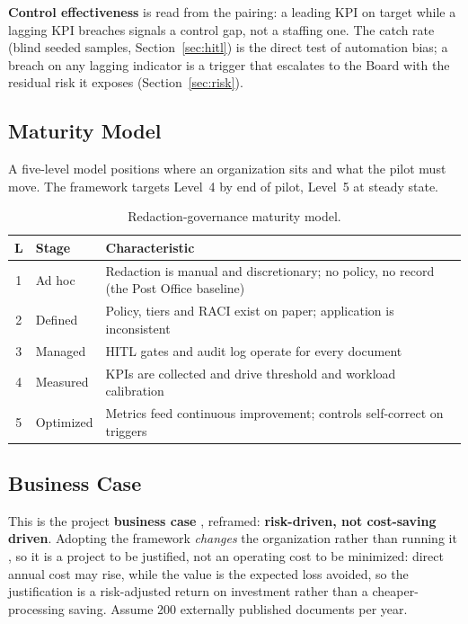 \documentclass[12pt,a4paper]{article}
\begin{document}
\textbf{Control effectiveness} is read from the pairing: a leading KPI on target while a lagging KPI breaches signals a control gap, not a staffing one. The catch rate (blind seeded samples, Section~\ref{sec:hitl}) is the direct test of automation bias; a breach on any lagging indicator is a trigger that escalates to the Board with the residual risk it exposes (Section~\ref{sec:risk}).

\subsection{Maturity Model}

A five-level model positions where an organization sits and what the pilot must move. The framework targets Level~4 by end of pilot, Level~5 at steady state.

\begin{table}[H]
\centering
\small
{}
\begin{tabular}{@{} c p{2.6cm} p{8.8cm} @{}}
\toprule
\textbf{\color{accentdark}L} & \textbf{\color{accentdark}Stage} & \textbf{\color{accentdark}Characteristic} \\
\midrule
1 & Ad hoc & Redaction is manual and discretionary; no policy, no record (the Post Office baseline) \\
2 & Defined & Policy, tiers and RACI exist on paper; application is inconsistent \\
3 & Managed & HITL gates and audit log operate for every document \\
4 & Measured & KPIs are collected and drive threshold and workload calibration \\
5 & Optimized & Metrics feed continuous improvement; controls self-correct on triggers \\
\bottomrule
\end{tabular}
\caption{Redaction-governance maturity model.}
\label{tab:maturity}
\end{table}

\subsection{Business Case}

This is the project \textbf{business case} \cite{falchi_slides}, reframed: \textbf{risk-driven, not cost-saving driven}. Adopting the framework \emph{changes} the organization rather than running it \cite{falchi_slides}, so it is a project to be justified, not an operating cost to be minimized: direct annual cost may rise, while the value is the expected loss avoided, so the justification is a risk-adjusted return on investment rather than a cheaper-processing saving. Assume 200 externally published documents per year.
\end{document}
